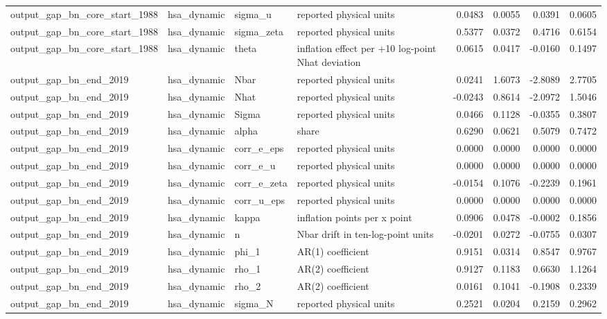 \begin{tabular}{llllrrrr}
output\_gap\_bn\_core\_start\_1988 & hsa\_dynamic & sigma\_u & reported physical units & 0.0483 & 0.0055 & 0.0391 & 0.0605 \\
output\_gap\_bn\_core\_start\_1988 & hsa\_dynamic & sigma\_zeta & reported physical units & 0.5377 & 0.0372 & 0.4716 & 0.6154 \\
output\_gap\_bn\_core\_start\_1988 & hsa\_dynamic & theta & inflation effect per +10 log-point Nhat deviation & 0.0615 & 0.0417 & -0.0160 & 0.1497 \\
output\_gap\_bn\_end\_2019 & hsa\_dynamic & Nbar & reported physical units & 0.0241 & 1.6073 & -2.8089 & 2.7705 \\
output\_gap\_bn\_end\_2019 & hsa\_dynamic & Nhat & reported physical units & -0.0243 & 0.8614 & -2.0972 & 1.5046 \\
output\_gap\_bn\_end\_2019 & hsa\_dynamic & Sigma & reported physical units & 0.0466 & 0.1128 & -0.0355 & 0.3807 \\
output\_gap\_bn\_end\_2019 & hsa\_dynamic & alpha & share & 0.6290 & 0.0621 & 0.5079 & 0.7472 \\
output\_gap\_bn\_end\_2019 & hsa\_dynamic & corr\_e\_eps & reported physical units & 0.0000 & 0.0000 & 0.0000 & 0.0000 \\
output\_gap\_bn\_end\_2019 & hsa\_dynamic & corr\_e\_u & reported physical units & 0.0000 & 0.0000 & 0.0000 & 0.0000 \\
output\_gap\_bn\_end\_2019 & hsa\_dynamic & corr\_e\_zeta & reported physical units & -0.0154 & 0.1076 & -0.2239 & 0.1961 \\
output\_gap\_bn\_end\_2019 & hsa\_dynamic & corr\_u\_eps & reported physical units & 0.0000 & 0.0000 & 0.0000 & 0.0000 \\
output\_gap\_bn\_end\_2019 & hsa\_dynamic & kappa & inflation points per x point & 0.0906 & 0.0478 & -0.0002 & 0.1856 \\
output\_gap\_bn\_end\_2019 & hsa\_dynamic & n & Nbar drift in ten-log-point units & -0.0201 & 0.0272 & -0.0755 & 0.0307 \\
output\_gap\_bn\_end\_2019 & hsa\_dynamic & phi\_1 & AR(1) coefficient & 0.9151 & 0.0314 & 0.8547 & 0.9767 \\
output\_gap\_bn\_end\_2019 & hsa\_dynamic & rho\_1 & AR(2) coefficient & 0.9127 & 0.1183 & 0.6630 & 1.1264 \\
output\_gap\_bn\_end\_2019 & hsa\_dynamic & rho\_2 & AR(2) coefficient & 0.0161 & 0.1041 & -0.1908 & 0.2339 \\
output\_gap\_bn\_end\_2019 & hsa\_dynamic & sigma\_N & reported physical units & 0.2521 & 0.0204 & 0.2159 & 0.2962 \\

\end{tabular}
